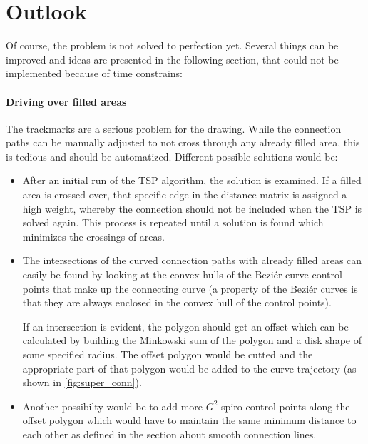 
\section{Outlook}\label{sec:outlook}
Of course, the problem is not solved to perfection yet. Several things can be improved and ideas are presented in the following section, that could not be implemented because of time constrains:

\paragraph{Driving over filled areas} The trackmarks are a serious problem for the drawing. While the connection paths can be manually adjusted to not cross through any already filled area, this is tedious and should be automatized. Different possible solutions would be:
\begin{itemize}
\item After an initial run of the TSP algorithm, the solution is examined. If a filled area is crossed over, that specific edge in the distance matrix is assigned a high weight, whereby the connection should not be included when the TSP is solved again. This process is repeated until a solution is found which minimizes the crossings of areas.
\item The intersections of the curved connection paths with already filled areas can easily be found by looking at the convex hulls of the Beziér curve control points that make up the connecting curve (a property of the Beziér curves is that they are always enclosed in the convex hull of the control points). 

If an intersection is evident, the polygon should get an offset which can be calculated by building the Minkowski sum of the polygon and a disk shape of some specified radius.  The offset polygon would be cutted and the appropriate part of that polygon would be added to the curve trajectory (as shown in \autoref{fig:super_conn}).
\item Another possibilty would be to add more $G^2$ spiro control points along the offset polygon which would have to maintain the same minimum distance to each other as defined in the section about smooth connection lines.
\end{itemize}

